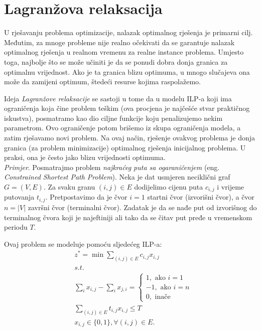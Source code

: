 \documentclass[a4paper, utf8, 11pt, colorlinks]{book}
\begin{document}
\section{Lagranžova relaksacija}
U rješavanju problema optimizacije, nalazak optimalnog rješenja je primarni cilj. Međutim, za mnoge probleme nije realno očekivati da se garantuje nalazak optimalnog rješenja u realnom vremenu za realne instance problema. Umjesto toga, najbolje što se može učiniti je da se ponudi dobra donja granica za optimalnu vrijednost. Ako je ta granica blizu optimuma, u mnogo slučajeva ona može da zamijeni optimum, štedeći resurse kojima raspolažemo. 

Ideja \emph{Lagranžove relaksacije} se sastoji u tome da u modelu ILP-a  koji ima  ograničenja koja čine problem teškim (ova procjena je najčešće stvar praktičnog iskustva),  posmatramo kao dio ciljne funkcije koju penalizujemo nekim parametrom.  %
Ovo ograničenje potom brišemo iz skupa ograničenja modela, a zatim rješavamo novi problem. Na ovaj način, rješenje ovakvog problema je donja granica (za problem minimizacije)  optimalnog rješenja inicijalnog problema. U praksi, ona je često jako blizu vrijednosti optimuma. \\

\emph{Primjer}. Posmatrajmo problem \emph{najkraćeg puta sa ogaraničenjem} (eng. \emph{Constrained Shortest Path Problem}). Neka je dat usmjeren neciklični graf $G=(V,E)$. Za svaku granu $(i,j) \in E$ dodijelimo cijenu puta $c_{i,j}$ i vrijeme putovanja $t_{i,j}$. Pretpostavimo da je čvor $i=1$ startni čvor (izvorišni čvor), a čvor $n = |V|$   završni čvor (terminalni čvor). Zadatak je da se nađe put  od izvorišnog do terminalnog čvora koji je najeftiniji ali tako da se čitav put pređe u vremenskom periodu $T$.

Ovaj problem se modeluje pomoću sljedećeg ILP-a:
 \begin{align}
    &z^*=\min\sum_{(i,j) \in E }c_{i,j}x_{i,j} \\
    &{s.t. }\\
    & \sum_{i} x_{i,j} - \sum_{i} x_{j,i} = \begin{cases}  
                                               1, \mbox{ ako } i=1 \\
                                              -1, \mbox{ ako } i=n \\
                                               0, \mbox{ inače }
                                            \end{cases} \\
    & \sum_{(i,j) \in E} t_{i,j} x_{i,j} \leq T \\
    & x_{i,j} \in \{0, 1 \}, \forall (i,j) \in E.
\end{align} 
\end{document}
